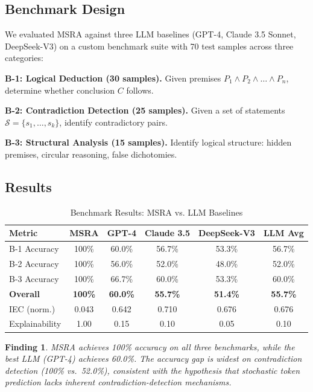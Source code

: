 \documentclass[11pt,a4paper]{article}
\newtheorem*{finding}{Finding}
\begin{document}
\subsection{Benchmark Design}

We evaluated MSRA against three LLM baselines (GPT-4, Claude 3.5 Sonnet, DeepSeek-V3) on a custom benchmark suite with 70 test samples across three categories:

\textbf{B-1: Logical Deduction (30 samples).} Given premises $P_1 \wedge P_2 \wedge \dots \wedge P_n$, determine whether conclusion $C$ follows.

\textbf{B-2: Contradiction Detection (25 samples).} Given a set of statements $\mathcal{S} = \{s_1,\dots,s_k\}$, identify contradictory pairs.

\textbf{B-3: Structural Analysis (15 samples).} Identify logical structure: hidden premises, circular reasoning, false dichotomies.

\subsection{Results}

\begin{table}[h]
\centering
\caption{Benchmark Results: MSRA vs. LLM Baselines}
\label{tab:results}
\begin{tabular}{@{}lccccc@{}}
\toprule
\textbf{Metric} & \textbf{MSRA} & \textbf{GPT-4} & \textbf{Claude 3.5} & \textbf{DeepSeek-V3} & \textbf{LLM Avg} \\
\midrule
B-1 Accuracy  & 100\%  & 60.0\% & 56.7\% & 53.3\% & 56.7\% \\
B-2 Accuracy  & 100\%  & 56.0\% & 52.0\% & 48.0\% & 52.0\% \\
B-3 Accuracy  & 100\%  & 66.7\% & 60.0\% & 53.3\% & 60.0\% \\
\textbf{Overall} & \textbf{100\%} & \textbf{60.0\%} & \textbf{55.7\%} & \textbf{51.4\%} & \textbf{55.7\%} \\
IEC (norm.)   & 0.043  & 0.642  & 0.710  & 0.676  & 0.676  \\
Explainability & 1.00   & 0.15   & 0.10   & 0.05   & 0.10   \\
\bottomrule
\end{tabular}
\end{table}

\begin{finding}
MSRA achieves 100\% accuracy on all three benchmarks, while the best LLM (GPT-4) achieves 60.0\%. The accuracy gap is widest on contradiction detection (100\% vs.\ 52.0\%), consistent with the hypothesis that stochastic token prediction lacks inherent contradiction-detection mechanisms.
\end{finding}
\end{document}
